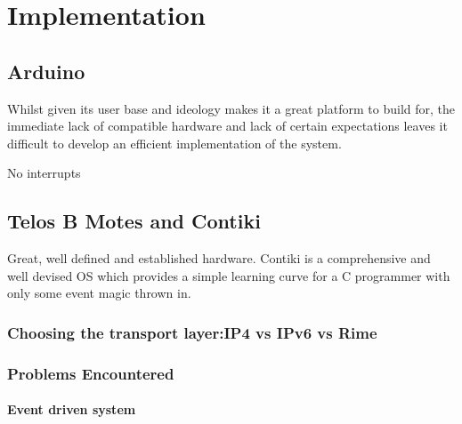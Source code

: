 \documentclass{l4proj}
\begin{document}




\chapter{Implementation} %
\label{cha:implementation}

\section{Arduino} %
\label{sec:arduino}
Whilst given its user base and ideology makes it a great platform to build for, the immediate lack of compatible hardware and lack of certain expectations leaves it difficult to develop an efficient implementation of the system.

No interrupts


\section{Telos B Motes and Contiki} %
\label{sec:contiki}
Great, well defined and established hardware.
Contiki is a comprehensive and well devised OS which provides a simple learning curve for a C programmer with only some event magic thrown in.

\subsection{Choosing the transport layer:IP4 vs IPv6 vs Rime} %
\label{sub:ip4_vs_ipv6_vs_rime}


\subsection{Problems Encountered} %
\label{sub:problems_encountered}

\subsubsection{Event driven system} %
\label{sub:event_driven_system}

\end{document}
